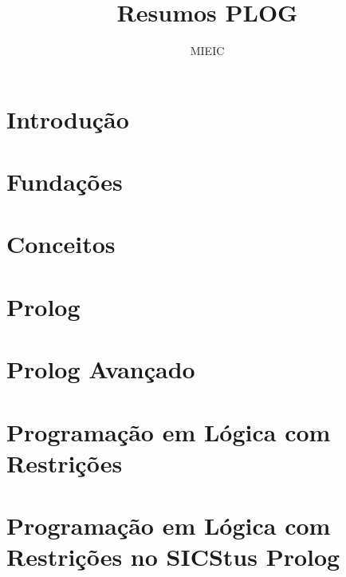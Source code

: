 \documentclass{article}
\title{Resumos PLOG}
\author{MIEIC}
\begin{document}
  
\maketitle

\tableofcontents

\section{Introdução}



\section{Fundações}



\section{Conceitos}



\section{Prolog}



\section{Prolog Avançado}



\section{Programação em Lógica com Restrições}



\section{Programação em Lógica com Restrições no SICStus Prolog}


\end{document}
